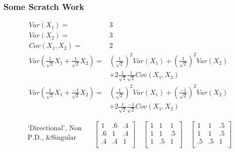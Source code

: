 \documentclass[xcolor={dvipsnames}]{beamer}
\begin{document}
\frame
{
\frametitle{Some Scratch Work}

\footnotesize
\vspace{-.5cm}

\begin{align*} %
   Var(X_{1}) = {}& 3\\
   Var(X_{2}) = {}& 3\\
   Cov(X_{1}, X_{2}) = {}& 2\\
   Var\left(\frac{1}{\sqrt{2}}X_{1}+\frac{1}{\sqrt{2}}X_{2}\right) = {}& \left(\frac{1}{\sqrt{2}}\right)^2Var(X_{1}) + \left(\frac{1}{\sqrt{2}}\right)^2Var(X_{2}) \\
    {}& + 2 \frac{1}{\sqrt{2}}  \frac{1}{\sqrt{2}}Cov(X_{1}, X_{2})\\
   Var\left(\frac{1}{\sqrt{2}}X_{1}+\frac{-1}{\sqrt{2}}X_{2}\right) = {}& \left(\frac{1}{\sqrt{2}}\right)^2Var(X_{1}) + \left(\frac{-1}{\sqrt{2}}\right)^2Var(X_{2}) \\
    {}& + 2 \frac{1}{\sqrt{2}}  \frac{-1}{\sqrt{2}}Cov(X_{1}, X_{2})
\end{align*}

}



\frame
{

$$
\begin{array}{c}
\text{`Directional', Non }\\ 
\text{P.D., \& Singular}\\
\end{array}
\quad
\left[
\begin{array}{ccc}
1 & .6 & .4 \\
.6 & 1 & .4 \\
.4 &  .4 & 1  \\
\end{array}
\right]
\quad
\left[
\begin{array}{ccc}
1 & 1 & 1 \\
1 & 1 & .5 \\
1 &  .5 & 1  \\
\end{array}
\right]
\quad
\left[
\begin{array}{ccc}
1 & 1 & .5 \\
1 & 1 & .5 \\
.5 &  .5 & 1  \\
\end{array}
\right]
$$
}
\end{document}

